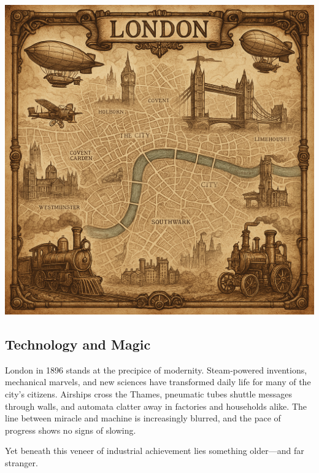 \vspace*{\fill}
\begin{center}
    \includegraphics[width=\linewidth]{img/pageart/london-map}
\end{center}
\vspace*{\fill}


\subsection{Technology and Magic}

London in 1896 stands at the precipice of modernity. Steam-powered inventions, mechanical marvels, and new sciences have transformed daily life for many of the city's citizens. Airships cross the Thames, pneumatic tubes shuttle messages through walls, and automata clatter away in factories and households alike. The line between miracle and machine is increasingly blurred, and the pace of progress shows no signs of slowing.

Yet beneath this veneer of industrial achievement lies something older—and far stranger.

